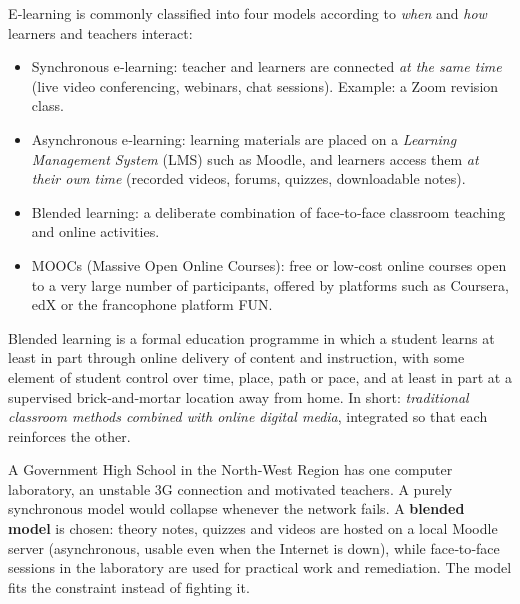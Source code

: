 \documentclass[11pt]{article}
\newcommand{\cle}[1]{{\popxbold\color{popdark}#1}}
\begin{document}
\begin{definition}
E‑learning is commonly classified into four models according to \emph{when} and \emph{how} learners and teachers interact:
\begin{itemize}
\item \cle{Synchronous e‑learning}: teacher and learners are connected \emph{at the same time} (live video conferencing, webinars, chat sessions). Example: a Zoom revision class.
\item \cle{Asynchronous e‑learning}: learning materials are placed on a \emph{Learning Management System} (LMS) such as Moodle, and learners access them \emph{at their own time} (recorded videos, forums, quizzes, downloadable notes).
\item \cle{Blended learning}: a deliberate combination of face‑to‑face classroom teaching and online activities.
\item \cle{MOOCs} (Massive Open Online Courses): free or low‑cost online courses open to a very large number of participants, offered by platforms such as Coursera, edX or the francophone platform FUN.
\end{itemize}
\end{definition}

\begin{definition}
\cle{Blended learning} is a formal education programme in which a student learns at least in part through online delivery of content and instruction, with some element of student control over time, place, path or pace, and at least in part at a supervised brick‑and‑mortar location away from home. In short: \emph{traditional classroom methods combined with online digital media}, integrated so that each reinforces the other.
\end{definition}

\begin{exemplebox}
A Government High School in the North‑West Region has one computer laboratory, an unstable 3G connection and motivated teachers. A purely synchronous model would collapse whenever the network fails. A \textbf{blended model} is chosen: theory notes, quizzes and videos are hosted on a local Moodle server (asynchronous, usable even when the Internet is down), while face‑to‑face sessions in the laboratory are used for practical work and remediation. The model fits the constraint instead of fighting it.
\end{exemplebox}
\end{document}
